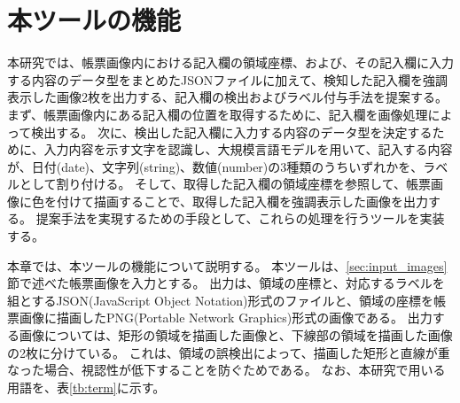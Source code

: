 \chapter{本ツールの機能}\label{cha:Function}
本研究では、帳票画像内における記入欄の領域座標、および、その記入欄に入力する内容のデータ型をまとめたJSONファイルに加えて、検知した記入欄を強調表示した画像2枚を出力する、記入欄の検出およびラベル付与手法を提案する。
まず、帳票画像内にある記入欄の位置を取得するために、記入欄を画像処理によって検出する。
次に、検出した記入欄に入力する内容のデータ型を決定するために、入力内容を示す文字を認識し、大規模言語モデルを用いて、記入する内容が、日付(date)、文字列(string)、数値(number)の3種類のうちいずれかを、ラベルとして割り付ける。
そして、取得した記入欄の領域座標を参照して、帳票画像に色を付けて描画することで、取得した記入欄を強調表示した画像を出力する。
提案手法を実現するための手段として、これらの処理を行うツールを実装する。

本章では、本ツールの機能について説明する。
本ツールは、\ref{sec:input_images}節で述べた帳票画像を入力とする。
出力は、領域の座標と、対応するラベルを組とするJSON(JavaScript Object Notation)形式のファイルと、領域の座標を帳票画像に描画したPNG(Portable Network Graphics)形式の画像である。
出力する画像については、矩形の領域を描画した画像と、下線部の領域を描画した画像の2枚に分けている。
これは、領域の誤検出によって、描画した矩形と直線が重なった場合、視認性が低下することを防ぐためである。
なお、本研究で用いる用語を、表\ref{tb:term}に示す。

